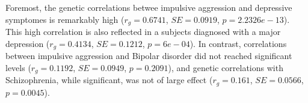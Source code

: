 Foremost, the genetic correlations betwee impulsive aggression and depressive symptomes is remarkably high ($r_g=0.6741$, $SE=0.0919$, $p=2.2326e-13$).
This high correlation is also reflected in a subjects diagnosed with a major depression ($r_g=0.4134$, $SE=0.1212$, $p=6e-04$).
In contrast, correlations between impulsive aggression and Bipolar disorder did not reached significant levels ($r_g=0.1192$, $SE=0.0949$, $p=0.2091$), and genetic correlations with Schizophrenia, while significant, was not of large effect ($r_g=0.161$, $SE=0.0566$, $p=0.0045$).
